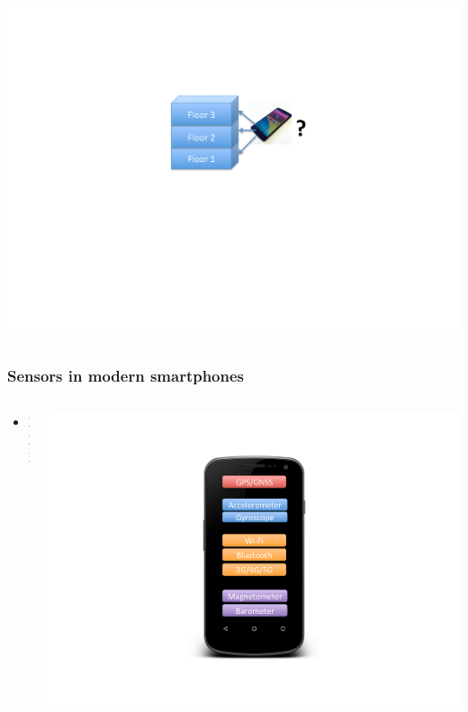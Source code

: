 \documentclass[xcolor=svgnames,english,handout]{beamer}
\begin{document}
\begin{frame}
\begin{columns}
\begin{column}{0.3\textwidth}
  \includegraphics[width=\columnwidth]{floor}
  \end{column}
  \end{columns}
\end{frame}

\begin{frame}
  \frametitle{Sensors in modern smartphones}

  \begin{columns}
  \begin{column}{0.6\textwidth}
  \begin{itemize}[<+->]       
  \item XXX
  \end{itemize}
  \end{column}
  \begin{column}{0.4\textwidth}
  \includegraphics[width=\columnwidth]{smartphone}
  \end{column}
  \end{columns}
\end{frame}
\end{document}
